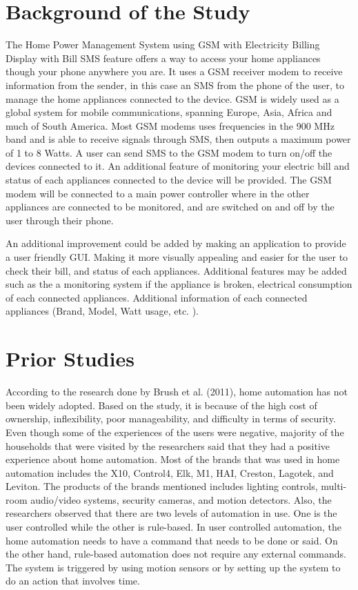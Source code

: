 	\section{Background of the Study}

	The Home Power Management System using GSM with Electricity Billing Display with Bill SMS feature offers a way to access your home appliances though your phone anywhere you are. It uses a GSM receiver modem to receive information from the sender, in this case an SMS from the phone of the user, to manage the home appliances connected to the device. GSM is widely used as a global system for mobile communications, spanning Europe, Asia, Africa and much of South America. Most GSM modems uses frequencies in the 900 MHz band and is able to receive signals through SMS, then outputs a maximum power of 1 to 8 Watts. A user can send SMS to the GSM modem to turn on/off the devices connected to it. An additional feature of monitoring your electric bill and status of each appliances connected to the device will be provided. The GSM modem will be connected to a main power controller where in the other appliances are connected to be monitored, and are switched on and off by the user through their phone. 

	An additional improvement could be added by making an application to provide a user friendly GUI. Making it more visually appealing and easier for the user to check their bill, and status of each appliances. Additional features may be added such as the a monitoring system if the appliance is broken, electrical consumption of each connected appliances. Additional information of each connected appliances (Brand, Model, Watt usage, etc. ).


\section{Prior Studies}

	According to the research done by Brush et al. (2011), home automation has not been widely adopted. Based on the study, it is because of the high cost of ownership, inflexibility, poor manageability, and difficulty in terms of security. Even though some of the experiences of the users were negative, majority of the households that were visited by the researchers said that they had a positive experience about home automation. Most of the brands that was used in home automation includes the X10, Control4, Elk, M1, HAI, Creston, Lagotek, and Leviton. The products of the brands mentioned includes lighting controls, multi-room audio/video systems, security cameras, and motion detectors. Also, the researchers observed that there are two levels of automation in use. One is the user controlled while the other is rule-based. In user controlled automation, the home automation needs to have a command that needs to be done or said. On the other hand, rule-based automation does not require any external commands. The system is triggered by using motion sensors or by setting up the system to do an action that involves time.

